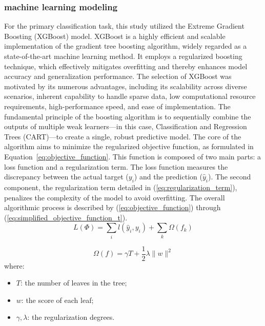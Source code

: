 \subsubsection{machine learning modeling}
For the primary classification task, this study utilized the Extreme Gradient Boosting (XGBoost) model\cite{mthd05}. XGBoost is a highly efficient and scalable implementation of the gradient tree boosting algorithm, widely regarded as a state-of-the-art machine learning method. It employs a regularized boosting technique, which effectively mitigates overfitting and thereby enhances model accuracy and generalization performance. The selection of XGBoost was motivated by its numerous advantages, including its scalability across diverse scenarios, inherent capability to handle sparse data, low computational resource requirements, high-performance speed, and ease of implementation. The fundamental principle of the boosting algorithm is to sequentially combine the outputs of multiple weak learners---in this case, Classification and Regression Trees (CART)---to create a single, robust predictive model. The core of the algorithm aims to minimize the regularized objective function, as formulated in Equation~\ref{eq:objective_function}. This function is composed of two main parts: a loss function and a regularization term. The loss function measures the discrepancy between the actual target ($y_i$) and the prediction ($\hat{y}_i$). The second component, the regularization term detailed in (\ref{eq:regularization_term}), penalizes the complexity of the model to avoid overfitting. The overall algorithmic process is described by (\ref{eq:objective_function}) through (\ref{eq:simplified_objective_function_t}).
\begin{equation} \label{eq:objective_function}
L(\Phi) = \sum_i l(\hat{y}_i, y_i) + \sum_k \Omega(f_k)
\end{equation}

\begin{equation} \label{eq:regularization_term}
\Omega(f) = \gamma T + \frac{1}{2} \lambda \|w\|^2
\end{equation}
where:
\begin{itemize}
    \item $T$: the number of leaves in the tree;
    \item $w$: the score of each leaf;
    \item $\gamma, \lambda$: the regularization degrees.
\end{itemize}

